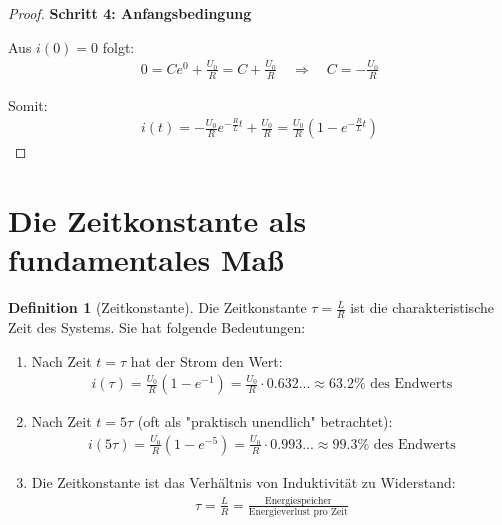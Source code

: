 ﻿\documentclass[a4paper,12pt]{report}
\theoremstyle{definition}
\newtheorem{definition}{Definition}
\begin{document}
\begin{proof}
		\textbf{Schritt 4: Anfangsbedingung}
		
		Aus $i(0) = 0$ folgt:
		\begin{align}
			0 = C e^0 + \frac{U_0}{R} = C + \frac{U_0}{R} \quad \Rightarrow \quad C = -\frac{U_0}{R}
		\end{align}
		
		Somit:
		\begin{align}
			i(t) = -\frac{U_0}{R} e^{-\frac{R}{L}t} + \frac{U_0}{R} = \frac{U_0}{R} \left(1 - e^{-\frac{R}{L}t}\right)
		\end{align}
	\end{proof}
	
	\section{Die Zeitkonstante als fundamentales Maß}
	
	\begin{definition}[Zeitkonstante]
		Die Zeitkonstante $\tau = \frac{L}{R}$ ist die charakteristische Zeit des Systems. Sie hat folgende Bedeutungen:
		
		\begin{enumerate}
			\item[-] Nach Zeit $t = \tau$ hat der Strom den Wert:
			\begin{align}
				i(\tau) = \frac{U_0}{R}(1 - e^{-1}) = \frac{U_0}{R} \cdot 0.632... \approx 63.2\% \text{ des Endwerts}
			\end{align}
			
			\item[-] Nach Zeit $t = 5\tau$ (oft als "praktisch unendlich" betrachtet):
			\begin{align}
				i(5\tau) = \frac{U_0}{R}(1 - e^{-5}) = \frac{U_0}{R} \cdot 0.993... \approx 99.3\% \text{ des Endwerts}
			\end{align}
			
			\item[-] Die Zeitkonstante ist das Verhältnis von Induktivität zu Widerstand:
			\begin{align}
				\tau = \frac{L}{R} = \frac{\text{Energiespeicher}}{\text{Energieverlust pro Zeit}}
			\end{align}
		\end{enumerate}
	\end{definition}
	
\end{document}
